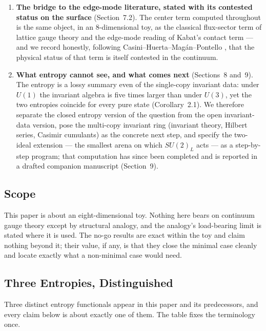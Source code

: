 \documentclass[11pt]{article}
\begin{document}
\begin{enumerate}
\item \textbf{The bridge to the edge-mode literature, stated with its contested status on the surface} (Section~7.2). The center term computed throughout is the same object, in an 8-dimensional toy, as the classical flux-sector term of lattice gauge theory \cite{chr, donnelly12, donnelly14} and the edge-mode reading of Kabat's contact term \cite{kabat, dw15, dw16} --- and we record honestly, following Casini--Huerta--Mag\'an--Pontello \cite{chmp}, that the physical status of that term is itself contested in the continuum.

\item \textbf{What entropy cannot see, and what comes next} (Sections~8 and~9). The entropy is a lossy summary even of the single-copy invariant data: under $U(1)$ the invariant algebra is five times larger than under $U(3)$, yet the two entropies coincide for every pure state (Corollary~2.1). We therefore separate the closed entropy version of the question from the open invariant-data version, pose the multi-copy invariant ring (invariant theory, Hilbert series, Casimir cumulants) as the concrete next step, and specify the two-ideal extension --- the smallest arena on which $SU(2)_L$ acts --- as a step-by-step program; that computation has since been completed and is reported in a drafted companion manuscript \cite{twoideal} (Section~9).

\end{enumerate}

\subsection{Scope}

This paper is about an eight-dimensional toy. Nothing here bears on continuum gauge theory except by structural analogy, and the analogy's load-bearing limit is stated where it is used. The no-go results are exact within the toy and claim nothing beyond it; their value, if any, is that they close the minimal case cleanly and locate exactly what a non-minimal case would need.

\subsection{Three Entropies, Distinguished}

Three distinct entropy functionals appear in this paper and its predecessors, and every claim below is about exactly one of them. The table fixes the terminology once.
\end{document}

